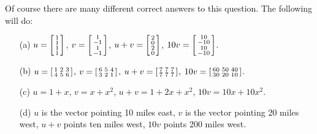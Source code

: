 \documentclass[a4paper]{amsart}
\theoremstyle{definition}
\newenvironment{solution}{{\noindent \bf Solution:}}{}
\begin{document}
\begin{solution}
 Of course there are many different correct answers to this
 question. The following will do:
 \begin{itemize}
  \item[(a)] $u=\left[\begin{smallmatrix} 1\\1\\1\\1\end{smallmatrix}\right]$,
             $v=\left[\begin{smallmatrix} 1\\-1\\1\\-1\end{smallmatrix}\right]$,
             $u+v=\left[\begin{smallmatrix} 2\\0\\2\\0\end{smallmatrix}\right]$,
             $10v=\left[\begin{smallmatrix} 10\\-10\\10\\-10\end{smallmatrix}\right]$.
  \item[(b)] $u=\left[\begin{smallmatrix} 1&2&3\\4&5&6\end{smallmatrix}\right]$,
             $v=\left[\begin{smallmatrix} 6&5&4\\3&2&1\end{smallmatrix}\right]$,
             $u+v=\left[\begin{smallmatrix} 7&7&7\\7&7&7\end{smallmatrix}\right]$,
             $10v=\left[\begin{smallmatrix} 60&50&40\\30&20&10\end{smallmatrix}\right]$.
  \item[(c)] $u=1+x$, $v=x+x^2$, $u+v=1+2x+x^2$, $10v=10x+10x^2$. 
  \item[(d)] $u$ is the vector pointing 10 miles east, $v$
   is the vector pointing 20 miles west, $u+v$ points ten
   miles west, $10v$ points 200 miles west.
 \end{itemize}
\end{solution}
\end{document}
